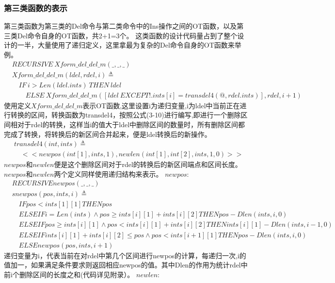 \subsubsection{第三类函数的表示}
第三类函数为第三类的Del命令与第二类命令中的Ins操作之间的OT函数，以及第三类Del命令自身的OT函数，共2+1=3个。
这类函数的设计代码量占到了整个设计的一半，大量使用了递归定义，这里拿最为复杂的Del命令自身的OT函数来举例。
\begin{align*}
&RECURSIVE\ Xform\_del\_del\_m(\_,\_,\_)\\
&Xform\_del\_del\_m (ldel,rdel,i) \triangleq \\
& \quad IF\ i > Len(ldel.ints)\ THEN\ ldel\\
& \quad \quad  ELSE\ Xform\_del\_del\_m ([ldel\ EXCEPT !.ints[i]= transdel4(@,rdel.ints)],rdel,i+1)
\end{align*}
使用定义$Xform\_del\_del\_m$表示OT函数,这里设置i为递归变量,i为ldel中当前正在进行转换的区间，转换函数为transdel4，按照公式(3-10)进行编写,即进行一个删除区间相对于rdel的转换，这样当i的值大于ldel中删除区间的数量时，所有删除区间都完成了转换，将转换后的新区间合并起来，便是ldel转换后的新操作。
\begin{align*}
&transdel4(int,ints) \triangleq \\ 
  & \quad <<newpos(int[1],ints,1),newlen(int[1],int[2],ints,1,0)   >>
\end{align*}
$newpos$和$newlen$便是这个删除区间对于rdel的转换后的新区间端点和区间长度。
$newpos$和$newlen$两个定义同样使用递归结构来表示。
$newpos$:
\begin{align*}
& RECURSIVE newpos(\_,\_,\_)\\
& snewpos(pos,ints,i) \triangleq\\
&\quad IF  pos < ints[1][1] THEN pos\\
&\quad ELSE IF i=Len(ints) \land pos \ge ints[i][1] + ints[i][2] THEN pos - Dlen(ints,i,0)\\
&\quad ELSE IF pos \ge ints[i][1] \land pos < ints[i][1] + ints[i][2] THEN ints[i][1] - Dlen(ints,i-1,0)\\
&\quad ELSE IF ints[i][1] + ints[i][2] \le pos \land pos < ints[i+1][1] THEN pos - Dlen(ints,i,0)\\
&\quad ELSE newpos(pos,ints,i+1)
\end{align*}
递归变量为i，代表当前在对rdel中第几个区间进行newpos的计算，每递归一次,i的值加一，如果满足条件要求则返回相应newpos的值。其中Dlen的作用为统计rdel中前i个删除区间的长度之和(代码详见附录）。
$newlen$:
